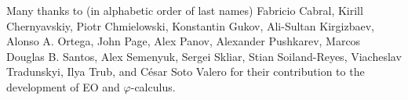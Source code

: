 \documentclass[sigplan,nonacm=true]{acmart}
\newcommand\nospell[1]{#1}
\theoremstyle{theorems}
\newcommand{\phic}{{$\varphi$-calculus}}
\newcommand{\eo}{{\sffamily EO}}
\begin{document}
Many thanks to (in alphabetic order of last names)
  \nospell{Fabricio Cabral},
  \nospell{Kirill Chernyavskiy},
  \nospell{Piotr Chmielowski},
  \nospell{Konstantin Gukov},
  \nospell{Ali-Sultan Kirgizbaev},
  \nospell{Alonso A. Ortega},
  \nospell{John Page},
  \nospell{Alex Panov},
  \nospell{Alexander Pushkarev},
  \nospell{Marcos Douglas B. Santos},
  \nospell{Alex Semenyuk},
  \nospell{Sergei Skliar},
  \nospell{Stian Soiland-Reyes},
  \nospell{Viacheslav Tradunskyi},
  \nospell{Ilya Trub},
  and
  \nospell{César Soto Valero}
for their contribution to the development of \eo{} and \phic{}.


\raggedright

\clearpage
\end{document}

